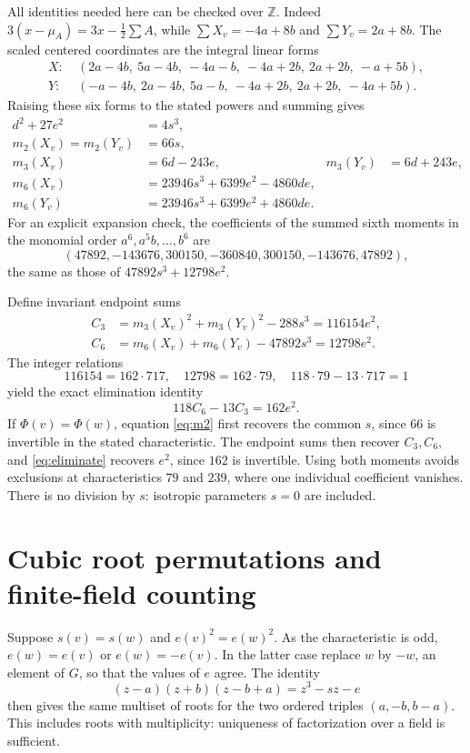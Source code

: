 \documentclass[11pt]{article}
\newcommand{\Z}{\mathbb Z}
\begin{document}
All identities needed here can be checked over $\Z$. Indeed
$3(x-\mu_A)=3x-\frac12\sum A$, while
$\sum X_v=-4a+8b$ and $\sum Y_v=2a+8b$. The scaled centered
coordinates are the integral linear forms
\begin{align*}
 X:\ &(2a-4b,\ 5a-4b,\ -4a-b,\ -4a+2b,\ 2a+2b,\ -a+5b),\\
 Y:\ &(-a-4b,\ 2a-4b,\ 5a-b,\ -4a+2b,\ 2a+2b,\ -4a+5b).
\end{align*}
Raising these six forms to the stated powers and summing gives
\begin{align}
 d^2+27e^2&=4s^3,\label{eq:disc}\\
 m_2(X_v)=m_2(Y_v)&=66s,\label{eq:m2}\\
 m_3(X_v)&=6d-243e,&m_3(Y_v)&=6d+243e,\label{eq:m3}\\
 m_6(X_v)&=23946s^3+6399e^2-4860de,\label{eq:m6x}\\
 m_6(Y_v)&=23946s^3+6399e^2+4860de.\label{eq:m6y}
\end{align}
For an explicit expansion check, the coefficients of the summed sixth
moments in the monomial order $a^6,a^5b,\ldots,b^6$ are
\[
 (47892,-143676,300150,-360840,300150,-143676,47892),
\]
the same as those of $47892s^3+12798e^2$.

Define invariant endpoint sums
\begin{align*}
 C_3&=m_3(X_v)^2+m_3(Y_v)^2-288s^3=116154e^2,\\
 C_6&=m_6(X_v)+m_6(Y_v)-47892s^3=12798e^2.
\end{align*}
The integer relations
\[
 116154=162\cdot717,\quad12798=162\cdot79,\quad
 118\cdot79-13\cdot717=1
\]
yield the exact elimination identity
\begin{equation}
 \boxed{118C_6-13C_3=162e^2.}\label{eq:eliminate}
\end{equation}
If $\Phi(v)=\Phi(w)$, equation \eqref{eq:m2} first recovers the common
$s$, since $66$ is invertible in the stated characteristic. The endpoint
sums then recover $C_3,C_6$, and \eqref{eq:eliminate} recovers $e^2$,
since $162$ is invertible. Using both moments avoids exclusions at
characteristics $79$ and $239$, where one individual coefficient vanishes.
There is no division by $s$: isotropic parameters $s=0$ are included.

\newpage
\section{Cubic root permutations and finite-field counting}
Suppose $s(v)=s(w)$ and $e(v)^2=e(w)^2$. As the characteristic is odd,
$e(w)=e(v)$ or $e(w)=-e(v)$. In the latter case replace $w$ by $-w$,
an element of $G$, so that the values of $e$ agree. The identity
\begin{equation}
 (z-a)(z+b)(z-b+a)=z^3-sz-e\label{eq:cubic}
\end{equation}
then gives the same multiset of roots for the two ordered triples
$(a,-b,b-a)$. This includes roots with multiplicity: uniqueness of
factorization over a field is sufficient.
\end{document}
